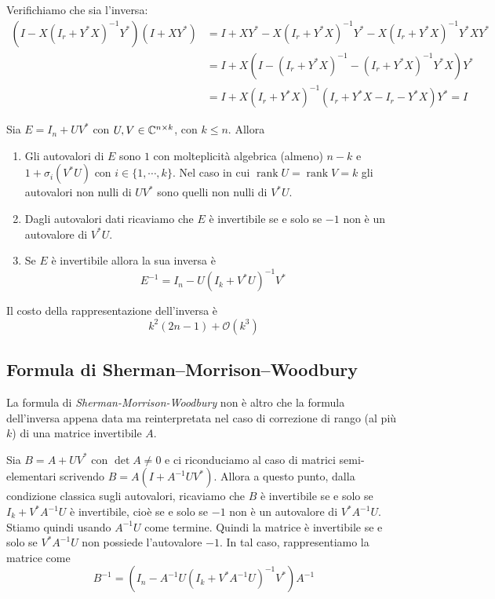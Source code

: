\documentclass[a4paper]{article}
\begin{document}
\pagebreak

Verifichiamo che sia l'inversa:
\begin{align*}
    \left(I - X \left(I_r + Y^*X\right)^{-1} Y^*\right)
    (I + XY^*)
    &= I + XY^* - X \left(I_r + Y^*X\right)^{-1}Y^*
    - X \left(I_r + Y^*X\right)^{-1} Y^*XY^* \\
    &= I + X\left(
        I - (I_r + Y^*X)^{-1} - (I_r + Y^*X)^{-1}Y^*X
    \right)Y^* \\
    &= I + X \left(I_r + Y^*X\right)^{-1} \left(
        I_r + Y^*X - I_r - Y^*X
    \right)Y^*
    = I
\end{align*}

\begin{snippetproposition}{}
    Sia \(E = I_n + UV^*\) con
    \(U,V \in \mathbb{C}^{n \times k}\), con \(k\leq n\).
    Allora
    \begin{enumerate}
        \item Gli autovalori di \(E\)
            sono \(1\) con molteplicità algebrica (almeno) \(n-k\)
            e \(1 + \sigma_i(V^*U)\)
            con \(i \in \{1, \cdots, k\}\).
            Nel caso in cui \(\operatorname{rank} U = \operatorname{rank} V = k\)
            gli autovalori non nulli di \(UV^*\) sono quelli non nulli di \(V^*U\).
        \item Dagli autovalori dati ricaviamo che \(E\) è invertibile se e solo
            se \(-1\) non è un autovalore di \(V^*U\).
        \item Se \(E\) è invertibile allora la sua inversa è
            \[
                E^{-1}
                = I_n - U(I_k + V^*U)^{-1}V^*
            \]
    \end{enumerate}
\end{snippetproposition}

Il costo della rappresentazione dell'inversa
è \[
    k^2(2n-1) + \mathcal O(k^3)
\]

\subsection{Formula di Sherman--Morrison--Woodbury}

La formula di \emph{Sherman-Morrison-Woodbury}
non è altro che la formula dell'inversa appena data ma reinterpretata nel caso di correzione di rango
(al più \(k\)) di una matrice invertibile \(A\).

Sia \(B = A + UV^*\)
con \(\det A \neq 0\)
e ci riconduciamo al caso di matrici semi-elementari scrivendo
\(B = A(I + A^{-1} U V^*)\).
Allora a questo punto, dalla condizione classica sugli autovalori,
ricaviamo che \(B\) è invertibile se e solo se
\(I_k + V^*A^{-1}U\) è invertibile, cioè se e solo se \(-1\) non è un autovalore di \(V^*A^{-1}U\).
Stiamo quindi usando \(A^{-1}U\) come termine.
Quindi la matrice è invertibile se e solo se \(V^* A^{-1} U\)
non possiede l'autovalore \(-1\).
In tal caso, rappresentiamo la matrice come
\[
    B^{-1} = \left(
        I_n - A^{-1} U(I_k + V^* A^{-1} U)^{-1}V^*
    \right)A^{-1}
\]
\end{document}
